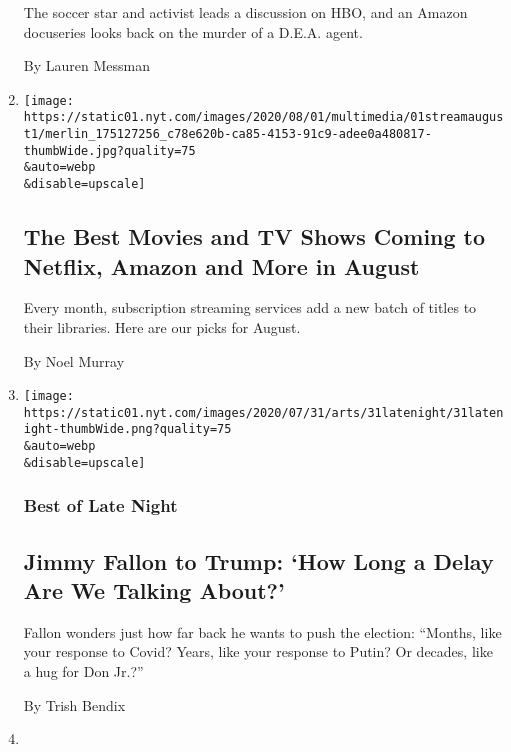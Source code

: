 \begin{enumerate}
  The soccer star and activist leads a discussion on HBO, and an Amazon
  docuseries looks back on the murder of a D.E.A. agent.

  By Lauren Messman
\item
  \href{/2020/07/31/arts/television/new-to-stream-netflix.html}{}

  \texttt{[image: https://static01.nyt.com/images/2020/08/01/multimedia/01streamaugust1/merlin\_175127256\_c78e620b-ca85-4153-91c9-adee0a480817-thumbWide.jpg?quality=75\\\&auto=webp\\\&disable=upscale]}

  \hypertarget{the-best-movies-and-tv-shows-coming-to-netflix-amazon-and-more-in-august}{%
  \subsection{The Best Movies and TV Shows Coming to Netflix, Amazon and
  More in
  August}\label{the-best-movies-and-tv-shows-coming-to-netflix-amazon-and-more-in-august}}

  Every month, subscription streaming services add a new batch of titles
  to their libraries. Here are our picks for August.

  By Noel Murray
\item
  \href{/2020/07/31/arts/television/late-night-trump-delay-election.html}{}

  \texttt{[image: https://static01.nyt.com/images/2020/07/31/arts/31latenight/31latenight-thumbWide.png?quality=75\\\&auto=webp\\\&disable=upscale]}

  \hypertarget{best-of-late-night}{%
  \subsubsection{Best of Late Night}\label{best-of-late-night}}

  \hypertarget{jimmy-fallon-to-trump-how-long-a-delay-are-we-talking-about}{%
  \subsection{Jimmy Fallon to Trump: `How Long a Delay Are We Talking
  About?'}\label{jimmy-fallon-to-trump-how-long-a-delay-are-we-talking-about}}

  Fallon wonders just how far back he wants to push the election:
  ``Months, like your response to Covid? Years, like your response to
  Putin? Or decades, like a hug for Don Jr.?''

  By Trish Bendix
\item
  \href{/2020/07/31/arts/television/whats-on-tv-friday-black-is-king-and-little-women.html}{}


\end{enumerate}
